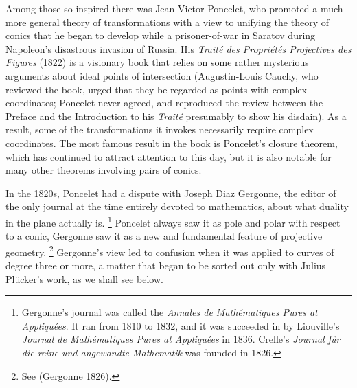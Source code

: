 Among those so inspired there was Jean Victor Poncelet,
%
 who promoted
a much more general theory of transformations with a view to unifying
the theory of conics that he began to develop while a prisoner-of-war
in Saratov during Napoleon's disastrous invasion of Russia. His
\emph{Trait\'e des Propri\'et\'es Projectives des Figures} (1822) is a
visionary book that relies on some rather mysterious arguments about ideal
points of intersection (Augustin-Louis Cauchy,
%
 who reviewed the book,
urged that they be regarded as points with complex coordinates;
%
 Poncelet
never agreed, and reproduced the review between the Preface and the
Introduction to his \emph{Trait\'e}  presumably to show his disdain). As
a result, some of the transformations it invokes necessarily require
complex coordinates. The most famous result in the book is Poncelet's
closure theorem,
%
 which has continued to attract attention to this day,
but it is also notable for many other theorems involving pairs of conics.


In the 1820s, Poncelet had a dispute with Joseph Diaz Gergonne,
%
 the editor
of the only journal at the time entirely devoted to mathematics, about
what duality in the plane actually is.%
%
\footnote{Gergonne's journal was
called the \emph{Annales de Math\'ematiques Pures at Appliqu\'ees}. It ran
%
from 1810 to 1832, and  it was succeeded in by Liouville's
%
\emph{Journal
%
de Math\'ematiques Pures at Appliqu\'ees} in 1836. Crelle's
%
\emph{Journal
%
f\"ur die reine und angewandte Mathematik} was founded in 1826.}
%
Poncelet always saw it as pole and polar with respect to a conic,
Gergonne saw it as a new and fundamental feature of projective
%
geometry.%
%
\footnote{See (Gergonne 1826).} 
%
Gergonne's view led to confusion
when it was applied to curves of degree three or more, a matter that began
to be sorted out only with Julius Pl\"ucker's work, as we shall see below.


